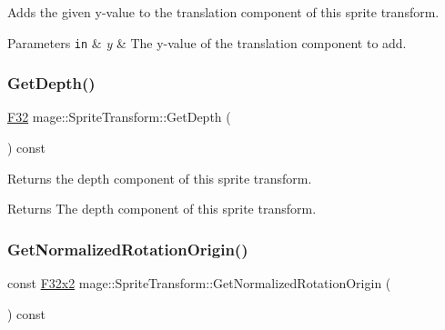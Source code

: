 Adds the given y-\/value to the translation component of this sprite transform.


\begin{DoxyParams}[1]{Parameters}
\mbox{\tt in}  & {\em y} & The y-\/value of the translation component to add. \\
\hline
\end{DoxyParams}
\hypertarget{classmage_1_1_sprite_transform_acbb61149d34be717c43a78fc9113fe9c}{}\label{classmage_1_1_sprite_transform_acbb61149d34be717c43a78fc9113fe9c} 
\subsubsection{\texorpdfstring{Get\+Depth()}{GetDepth()}}
{\footnotesize\ttfamily \hyperlink{namespacemage_aa97e833b45f06d60a0a9c4fc22ae02c0}{F32} mage\+::\+Sprite\+Transform\+::\+Get\+Depth (\begin{DoxyParamCaption}{ }\end{DoxyParamCaption}) const\hspace{0.3cm}{\ttfamily [noexcept]}}

Returns the depth component of this sprite transform.

\begin{DoxyReturn}{Returns}
The depth component of this sprite transform. 
\end{DoxyReturn}
\hypertarget{classmage_1_1_sprite_transform_aa3b7b5d1f060c2a60a08545f5b217d62}{}\label{classmage_1_1_sprite_transform_aa3b7b5d1f060c2a60a08545f5b217d62} 
\subsubsection{\texorpdfstring{Get\+Normalized\+Rotation\+Origin()}{GetNormalizedRotationOrigin()}}
{\footnotesize\ttfamily const \hyperlink{namespacemage_aa87237ad091f5cd7da612b8523fc108f}{F32x2} mage\+::\+Sprite\+Transform\+::\+Get\+Normalized\+Rotation\+Origin (\begin{DoxyParamCaption}{ }\end{DoxyParamCaption}) const}

